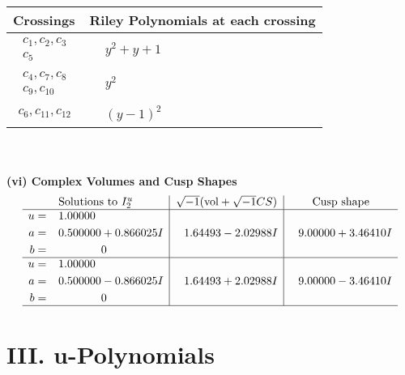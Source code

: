 \documentclass[1p]{elsarticle_modified}
\theoremstyle{definition}
\newcommand{\I}{\sqrt{-1}}
\begin{document}
\begin{tabular}{m{50pt}|m{274pt}}
Crossings & \hspace{64pt}Riley Polynomials at each crossing \\
\hline $$\begin{aligned}c_{1},c_{2},c_{3}\\c_{5}\end{aligned}$$&$\begin{aligned}
&y^2+y+1
\end{aligned}$\\
\hline $$\begin{aligned}c_{4},c_{7},c_{8}\\c_{9},c_{10}\end{aligned}$$&$\begin{aligned}
&y^2
\end{aligned}$\\
\hline $$\begin{aligned}c_{6},c_{11},c_{12}\end{aligned}$$&$\begin{aligned}
&(y-1)^2
\end{aligned}$\\
\hline
\end{tabular}\\~\\
\newpage\flushleft \textbf{(vi) Complex Volumes and Cusp Shapes}
$$\begin{array}{c|c|c}  
\text{Solutions to }I^u_{2}& \I (\text{vol} + \sqrt{-1}CS) & \text{Cusp shape}\\
 \hline 
\begin{aligned}
u &= \phantom{-}1.00000\phantom{ +0.000000I} \\
a &= \phantom{-}0.500000 + 0.866025 I \\
b &= \phantom{-0.000000 } 0\end{aligned}
 & \phantom{-}1.64493 - 2.02988 I & \phantom{-}9.00000 + 3.46410 I \\ \hline\begin{aligned}
u &= \phantom{-}1.00000\phantom{ +0.000000I} \\
a &= \phantom{-}0.500000 - 0.866025 I \\
b &= \phantom{-0.000000 } 0\end{aligned}
 & \phantom{-}1.64493 + 2.02988 I & \phantom{-}9.00000 - 3.46410 I\\
 \hline 
 \end{array}$$\newpage
\newpage\renewcommand{\arraystretch}{1}
\centering \section*{ III. u-Polynomials}
\end{document}
